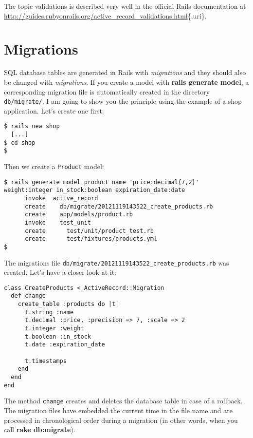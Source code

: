 \documentclass[a4paper]{book}
\newcounter{tab}[chapter]
\begin{document}
The topic validations is described very well in the official Rails documentation at \url{http://guides.rubyonrails.org/active_record_validations.html}\{.uri\}.

\section{Migrations}\label{migrations}

SQL database tables are generated in Rails with \emph{migrations} and they should also be changed with \emph{migrations}. If you create a model with \textbf{rails generate model}, a corresponding migration file is automatically created in the directory \texttt{db/migrate/}. I am going to show you the principle using the example of a shop application. Let's create one first:

\begin{shaded}\begin{verbatim}
$ rails new shop
  [...]
$ cd shop
$
\end{verbatim}\end{shaded}

Then we create a \texttt{Product} model:

\begin{shaded}\begin{verbatim}
$ rails generate model product name 'price:decimal{7,2}' weight:integer in_stock:boolean expiration_date:date
      invoke  active_record
      create    db/migrate/20121119143522_create_products.rb
      create    app/models/product.rb
      invoke    test_unit
      create      test/unit/product_test.rb
      create      test/fixtures/products.yml
$
\end{verbatim}\end{shaded}

The migrations file \texttt{db/migrate/20121119143522\_create\_products.rb} was created. Let's have a closer look at it:

\begin{shaded}\begin{verbatim}
class CreateProducts < ActiveRecord::Migration
  def change
    create_table :products do |t|
      t.string :name
      t.decimal :price, :precision => 7, :scale => 2
      t.integer :weight
      t.boolean :in_stock
      t.date :expiration_date

      t.timestamps
    end
  end
end
\end{verbatim}\end{shaded}

The method \texttt{change} creates and deletes the database table in case of a rollback. The migration files have embedded the current time in the file name and are processed in chronological order during a migration (in other words, when you call \textbf{rake db:migrate}).
\end{document}
